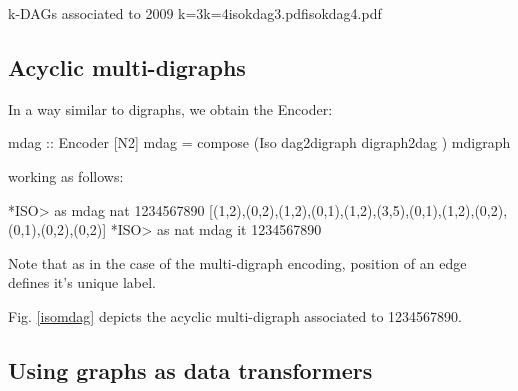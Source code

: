\documentclass[]{INCLUDES/llncs}
\begin{document}
{k-DAGs associated to 2009}
{k=3}{k=4}{isokdag3.pdf}{isokdag4.pdf}


\subsection{Acyclic multi-digraphs}

In a way similar to digraphs, we obtain the Encoder:
\begin{code}
mdag :: Encoder [N2]
mdag = compose (Iso dag2digraph digraph2dag ) mdigraph
\end{code}
working as follows:
\begin{codex}
*ISO> as mdag nat 1234567890
[(1,2),(0,2),(1,2),(0,1),(1,2),(3,5),(0,1),(1,2),(0,2),(0,1),(0,2),(0,2)]
*ISO> as nat  mdag it
1234567890
\end{codex}
Note that as in the case of the multi-digraph encoding, position of an edge
defines it's unique label.

Fig. \ref{isomdag} depicts the acyclic multi-digraph associated to 1234567890.

 

\subsection{Using graphs as data transformers}
\end{document}

